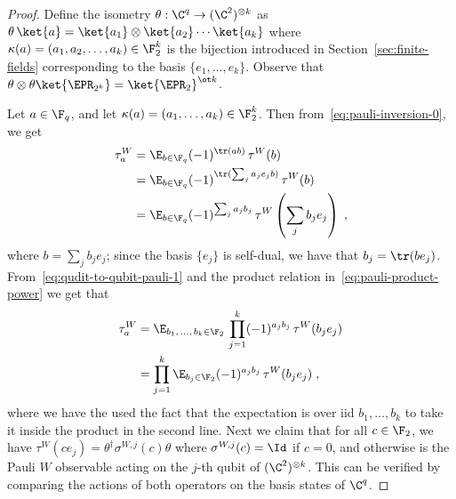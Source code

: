 \begin{proof}
Define the isometry $\theta : \C^q \to (\C^2)^{\otimes k}$ as $\theta\,
  \ket{a} = \ket{a_1} \otimes \ket{ a_2} \cdots \ket{a_k}$ where $\kappa(a) = (a_1, a_2, \ldots, a_k)
  \in \F_2^k$ is the bijection introduced in Section~\ref{sec:finite-fields}
  corresponding to the basis $\{e_1,\ldots,e_k\}$. Observe that
  $\theta \otimes \theta \ket{\EPR_{2^k}} = \ket{\EPR_2}^{\ot k}$.

  Let $a \in \F_q$, and let $\kappa(a) = (a_1,\ldots,a_k) \in \F_2^k$.
  Then from~\eqref{eq:pauli-inversion-0}, we get
  \begin{equation}
    \label{eq:qudit-to-qubit-pauli-1}
    \begin{split}
      \tau^W_a
      & = \E_{b \in \F_q} (-1)^{\tr(a b)} \, \tau^W(b) \\
      & = \E_{b \in \F_q} (-1)^{\tr(\sum_j a_j e_j b)} \, \tau^W(b) \\
      & = \E_{b \in \F_q} (-1)^{\sum_j a_j b_j} \,
      \tau^W \left ( \sum_j b_j e_j \right) \;,
    \end{split}
  \end{equation}
  where $b = \sum_j b_j e_j$; since the basis $\{e_j \}$ is self-dual, we have
  that $b_j = \tr(b e_j)$. From~\eqref{eq:qudit-to-qubit-pauli-1} and
  the product relation in~\eqref{eq:pauli-product-power} we get that
  \begin{equation}
		\label{eq:qudit-to-qubit-pauli}
    \begin{split}
      \tau^W_a & = \E_{b_1,\, \ldots,\, b_k \in \F_2}\,
      \prod_{j=1}^k (-1)^{a_j b_j} \, \tau^W(b_j e_j) \\
      & = \prod_{j=1}^k \E_{b_j \in \F_2} (-1)^{a_j b_j} \, \tau^W(b_j e_j)\;,
    \end{split}
  \end{equation}
  where we have the used the fact that the expectation is over iid
  $b_1, \dots, b_k$ to take it inside the product in the second line.
  Next we claim that for all $c \in \F_2$, we have $\tau^W(c e_j) =
  \theta^\dagger \sigma^{W,j} (c) \theta$ where $\sigma^{W,j}(c) = \Id$ if $c =
  0$, and otherwise is the Pauli $W$ observable acting on the $j$-th qubit of
  $(\C^2)^{\otimes k}$. This can be verified by comparing the actions of both
  operators on the basis states of $\C^q$.
  

\end{proof}
